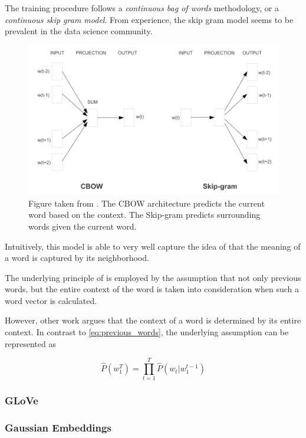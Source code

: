 \documentclass[a4paper,12pt,twoside,openright]{report}
\begin{document}
The training procedure follows a \textit{continuous bag of words} methodology, or a \textit{continuous skip gram model}.
From experience, the skip gram model seems to be prevalent in the data science community. 

\begin{figure}
	\center
  \includegraphics[width=0.6\linewidth]{./assets/background/cbow_and_skipgram.png}
  \caption{Figure taken from \cite{mikolov13}. The CBOW architecture predicts the current word based on the context. The Skip-gram predicts surrounding words given the current word.}
  \label{fig:boat1}
\end{figure}

Intuitively, this model is able to very well capture the idea of \cite{harris54} that the meaning of a word is captured by its neighborhood.

The underlying principle of \cite{mikolov13} is employed by the assumption that not only previous words, but the entire context of the word is taken into consideration when such a word vector is calculated.

However, other work argues that the context of a word is determined by its entire context.
In contrast to \eqref{eq:previous_words}, the underlying assumption can be represented as 

\begin{equation}
\hat{P}\left(w_{1}^{T}\right)=\prod_{t=1}^{T} \hat{P}\left(w_{t} | w_{1}^{t-1}\right)
\end{equation}

\subsubsection{GLoVe}


\subsubsection{Gaussian Embeddings}
\end{document}
